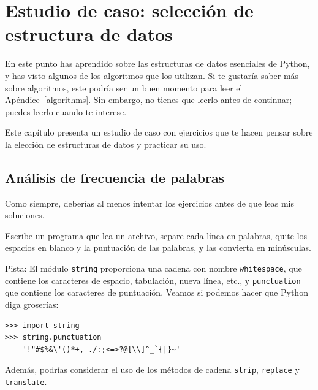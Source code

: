 \documentclass[10pt]{book}
\begin{document}




\chapter{Estudio de caso: selección de estructura de datos}

En este punto has aprendido sobre las estructuras de datos esenciales de Python,
y has visto algunos de los algoritmos que los utilizan.
Si te gustaría saber más sobre algoritmos, este podría ser un buen
momento para leer el Apéndice~\ref{algorithms}.
Sin embargo, no tienes que leerlo antes de continuar; puedes leerlo
cuando te interese.

Este capítulo presenta un estudio de caso con ejercicios que te hacen
pensar sobre la elección de estructuras de datos y practicar su uso.


\section{Análisis de frecuencia de palabras}
\label{analysis}

Como siempre, deberías al menos intentar los ejercicios
antes de que leas mis soluciones.

\begin{exercise}

Escribe un programa que lea un archivo, separe cada línea en
palabras, quite los espacios en blanco y la puntuación de las palabras,
y las convierta en minúsculas.

Pista: El módulo {\tt string} proporciona una cadena con nombre {\tt whitespace},
que contiene los caracteres de espacio, tabulación, nueva línea, etc.,
y {\tt punctuation} que contiene los caracteres de puntuación.  Veamos
si podemos hacer que Python diga groserías:

\begin{verbatim}
>>> import string
>>> string.punctuation
    '!"#$%&\'()*+,-./:;<=>?@[\\]^_`{|}~'
\end{verbatim}
%
Además, podrías considerar el uso de los métodos de cadena {\tt strip},
{\tt replace} y {\tt translate}.

\end{exercise}
\end{document}
